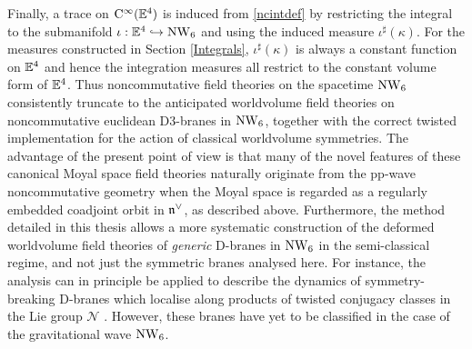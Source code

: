 Finally, a trace on ${\rm C}^\infty({\mathbb E}^4)$ is induced from \eqref{ncintdef} by
restricting the integral to the submanifold $\iota:{\mathbb E}^4\hookrightarrow\operatorname{NW}_6$ and
using the induced measure $\iota^\sharp(\kappa)$. For the measures constructed
in Section \ref{Integrals}, $\iota^\sharp(\kappa)$ is always a constant function
on ${\mathbb E}^4$ and hence the integration measures all restrict to the constant volume
form of ${\mathbb E}^4$. Thus noncommutative field theories on the spacetime $\operatorname{NW}_6$
consistently truncate to the anticipated worldvolume field theories on
noncommutative euclidean D3-branes in $\operatorname{NW}_6$, together with the correct twisted
implementation for the action of classical worldvolume symmetries. The advantage
of the present point of view is that many of the novel features of these
canonical Moyal space field theories naturally originate from the pp-wave
noncommutative geometry when the Moyal space is regarded as a regularly embedded
coadjoint orbit in ${\mathfrak n}^\vee$, as described above. Furthermore, the method
detailed in this thesis allows a more systematic construction of the deformed
worldvolume field theories of {\it generic} D-branes in $\operatorname{NW}_6$ in the
semi-classical regime, and not just the symmetric branes analysed here. For
instance, the analysis can in principle be applied to describe the dynamics of
symmetry-breaking D-branes which localise along products of twisted conjugacy
classes in the Lie group $\mathcal{N}$ \cite{Quella1}. However, these branes
have yet to be classified in the case of the gravitational wave $\operatorname{NW}_6$.

